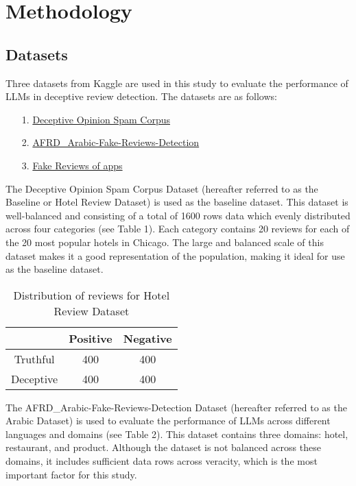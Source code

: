 \documentclass[sigconf, nonacm]{acmart}
\theoremstyle{definition}
\begin{document}
\section{Methodology}

\subsection{Datasets}
Three datasets from Kaggle are used in this study to evaluate the performance of LLMs in deceptive review detection. The datasets are as follows:

\begin{itemize}
  \item[1.] \href{https://www.kaggle.com/datasets/rtatman/deceptive-opinion-spam-corpus}{Deceptive Opinion Spam Corpus} \cite{ott-etal-2011-finding, ott-etal-2013-negative}
  \item[2.] \href{https://www.kaggle.com/datasets/shathaalturke/afrd-arabic-fake-reviews-detection}{AFRD\_Arabic-Fake-Reviews-Detection}
  \item[3.] \href{https://www.kaggle.com/datasets/umairanjacks/fake-reviews-of-apps}{Fake Reviews of apps}
\end{itemize}

The Deceptive Opinion Spam Corpus Dataset (hereafter referred to as the Baseline or Hotel Review Dataset) is used as the baseline dataset. This dataset is well-balanced and consisting of a total of 1600 rows data which evenly distributed across four categories (see Table 1). Each category contains 20 reviews for each of the 20 most popular hotels in Chicago. The large and balanced scale of this dataset makes it a good representation of the population, making it ideal for use as the baseline dataset.

\begin{table}[h!]
  \centering
  \caption{Distribution of reviews for Hotel Review Dataset}
  \begin{tabular}{c c c}
    \toprule
              & Positive & Negative \\
    \midrule
    Truthful  & 400      & 400      \\
    Deceptive & 400      & 400      \\
    \bottomrule
  \end{tabular}
\end{table}

The AFRD\_Arabic-Fake-Reviews-Detection Dataset (hereafter referred to as the Arabic Dataset) is used to evaluate the performance of LLMs across different languages and domains (see Table 2). This dataset contains three domains: hotel, restaurant, and product. Although the dataset is not balanced across these domains, it includes sufficient data rows across veracity, which is the most important factor for this study.
\end{document}
